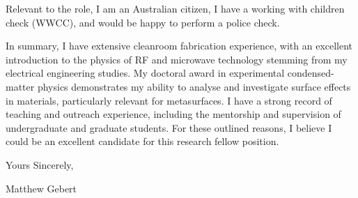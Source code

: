 \documentclass[10pt,a4paper,ragged2e,withhyper,paragraphstrue]{altacv}
\newcommand{\pind}{\hspace{24pt}}
\begin{document}
{    \pind Relevant to the role, I am an Australian citizen, I have a working with children check (WWCC), and would be happy to perform a
    police check.
    
    \vspace{1em}

    \pind In summary, I have extensive cleanroom fabrication experience, with an excellent introduction to the physics of RF and microwave
    technology stemming from my electrical engineering studies. My doctoral award in experimental condensed-matter physics demonstrates
    my ability to analyse and investigate surface effects in materials, particularly relevant for metasurfaces.
    I have a strong record of teaching and outreach experience, including the mentorship and supervision of undergraduate and graduate students.
    For these outlined reasons, I believe I could be an excellent candidate for this research fellow position.

    \vspace{1em}

    Yours Sincerely, \newline

    {\color{emphasis}Matthew Gebert}

    }
    
    \divider
\end{document}
